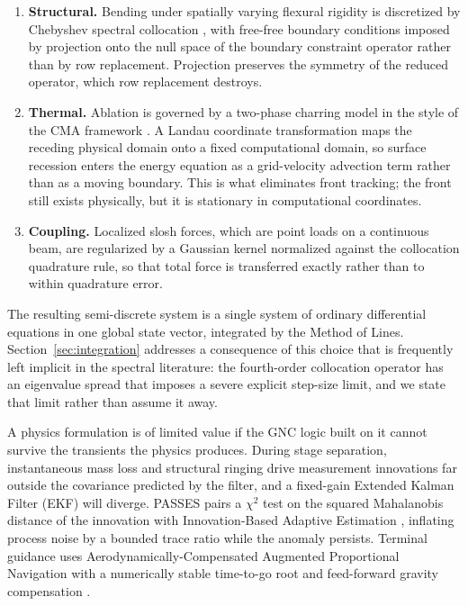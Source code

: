 \documentclass[11pt,a4paper]{article}
\theoremstyle{definition}
\numberwithin{equation}{section}
\begin{document}
\begin{enumerate}
    \item \textbf{Structural.} Bending under spatially varying flexural rigidity is discretized by Chebyshev spectral collocation \cite{trefethen2000}, with free-free boundary conditions imposed by projection onto the null space of the boundary constraint operator \cite{hsu2018} rather than by row replacement. Projection preserves the symmetry of the reduced operator, which row replacement destroys.

    \item \textbf{Thermal.} Ablation is governed by a two-phase charring model in the style of the CMA framework \cite{moyer1968, chen1999}. A Landau coordinate transformation maps the receding physical domain onto a fixed computational domain, so surface recession enters the energy equation as a grid-velocity advection term rather than as a moving boundary. This is what eliminates front tracking; the front still exists physically, but it is stationary in computational coordinates.

    \item \textbf{Coupling.} Localized slosh forces, which are point loads on a continuous beam, are regularized by a Gaussian kernel normalized against the collocation quadrature rule, so that total force is transferred exactly rather than to within quadrature error.
\end{enumerate}

The resulting semi-discrete system is a single system of ordinary differential equations in one global state vector, integrated by the Method of Lines. Section~\ref{sec:integration} addresses a consequence of this choice that is frequently left implicit in the spectral literature: the fourth-order collocation operator has an eigenvalue spread that imposes a severe explicit step-size limit, and we state that limit rather than assume it away.

A physics formulation is of limited value if the GNC logic built on it cannot survive the transients the physics produces. During stage separation, instantaneous mass loss and structural ringing drive measurement innovations far outside the covariance predicted by the filter, and a fixed-gain Extended Kalman Filter (EKF) will diverge. PASSES pairs a $\chi^2$ test on the squared Mahalanobis distance of the innovation \cite{barshalom2001} with Innovation-Based Adaptive Estimation \cite{mehra1970, mohamed1999, hide2003}, inflating process noise by a bounded trace ratio while the anomaly persists. Terminal guidance uses Aerodynamically-Compensated Augmented Proportional Navigation with a numerically stable time-to-go root and feed-forward gravity compensation \cite{zarchan2012}.
\end{document}
